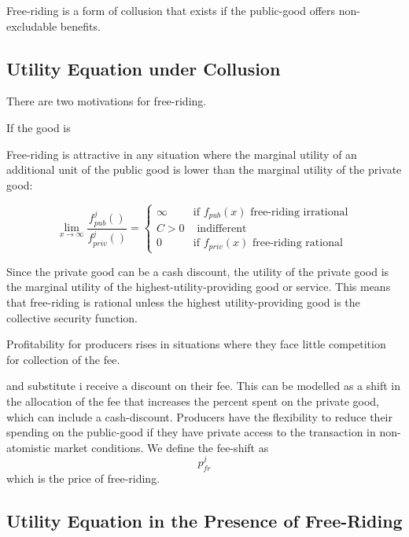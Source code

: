 \documentclass[oneside]{article}   	%
\begin{document}
Free-riding is a form of collusion that exists if the public-good offers non-excludable benefits.


\subsection*{Utility Equation under Collusion}

There are two motivations for free-riding.

If the good is





Free-riding is attractive in any situation where the marginal utility of an additional unit of the public good is lower than the marginal utility of the private good:

\[
\lim_{x \to \infty} \frac{f_{pub}^j()}{f_{priv}^j()} =
\begin{cases} 
\infty & \text{if } f_{pub}(x) \text{ free-riding irrational} \\
C > 0 & \text{ indifferent } \\
0 & \text{if } f_{priv}(x) \text{ free-riding rational}
\end{cases}
\]

Since the private good can be a cash discount, the utility of the private good is the marginal utility of the highest-utility-providing good or service. This means that free-riding is rational unless the highest utility-providing good is the collective security function.









Profitability for producers rises in situations where they face little competition for collection of the fee.


and substitute i  receive a discount on their fee. This can be modelled as a shift in the allocation of the fee that increases the percent spent on the private good, which can include a cash-discount. Producers have the flexibility to reduce their spending on the public-good if they have private access to the transaction in non-atomistic market conditions. We define the fee-shift as $$p_{fr}^j$$ which is the price of free-riding.




\subsection*{Utility Equation in the Presence of Free-Riding}
\end{document}
